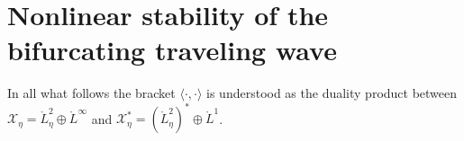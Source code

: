 \documentclass[11pt]{article}
\begin{document}








\section{Nonlinear stability of the bifurcating traveling wave}





In all what follows the bracket $\langle \cdot ,\cdot \rangle $ is
understood as the duality product between $\mathcal{X}_{\eta}=\mathring{L}%
_{\eta}^{2}\oplus \mathring{L}^{\infty }$ and $\mathcal{X}_{\eta}^{\ast }=(%
\mathring{L}_{\eta}^{2})^{\ast }\oplus \mathring{L}^{1}$.
\end{document}
